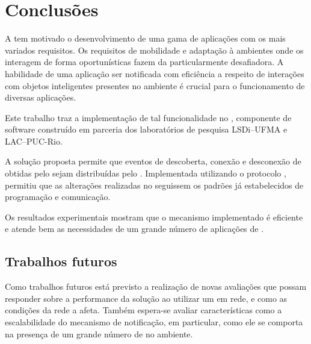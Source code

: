\chapter{Conclusões} \label{chap:conclusao}

A \iot tem motivado o desenvolvimento de uma gama de aplicações com os mais variados requisitos.
Os requisitos de mobilidade e adaptação à ambientes onde os \smartobjs interagem de forma oportunísticas fazem da \iomt particularmente desafiadora.
A habilidade de uma aplicação ser notificada com eficiência a respeito de interações com objetos inteligentes presentes no ambiente é crucial para o funcionamento de diversas aplicações.

Este trabalho traz a implementação de tal funcionalidade no \middleware \mhubcddl, componente de software construído em parceria dos laboratórios de pesquisa LSDi--UFMA e LAC--PUC-Rio.

A solução proposta permite que eventos de descoberta, conexão e desconexão de \smartobjs obtidas pelo \mhub sejam distribuídas pelo \cddl.
Implementada utilizando o protocolo \mqtt, permitiu que as alterações realizadas no \middleware seguissem os padrões já estabelecidos de programação e comunicação.

Os resultados experimentais mostram que o mecanismo implementado é eficiente e atende bem as necessidades de um grande número de aplicações de \iomt.

\section{Trabalhos futuros}

Como trabalhos futuros está previsto a realização de novas avaliações que possam responder sobre a performance da solução ao utilizar um \broker em rede, e como as condições da rede a afeta.
Também espera-se avaliar características como a escalabilidade do mecanismo de notificação, em particular, como ele se comporta na presença de um grande número de \smartobjs no ambiente.

